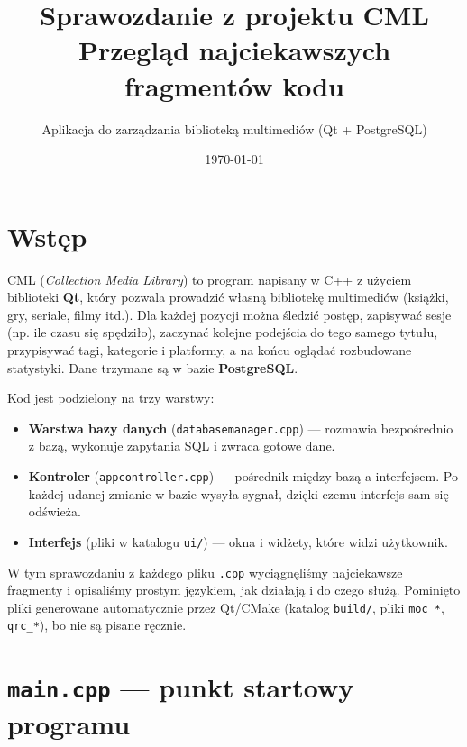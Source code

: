 \documentclass[11pt,a4paper]{article}
\title{\textbf{Sprawozdanie z projektu CML} \\[4pt]
\large Przegląd najciekawszych fragmentów kodu}
\author{Aplikacja do zarządzania biblioteką multimediów (Qt + PostgreSQL)}
\date{\today}
\begin{document}
\maketitle
\tableofcontents
\newpage

\section{Wstęp}

CML (\emph{Collection Media Library}) to program napisany w C++ z użyciem
biblioteki \textbf{Qt}, który pozwala prowadzić własną bibliotekę multimediów
(książki, gry, seriale, filmy itd.). Dla każdej pozycji można śledzić postęp,
zapisywać sesje (np. ile czasu się spędziło), zaczynać kolejne podejścia do
tego samego tytułu, przypisywać tagi, kategorie i platformy, a na końcu oglądać
rozbudowane statystyki. Dane trzymane są w bazie \textbf{PostgreSQL}.

Kod jest podzielony na trzy warstwy:

\begin{itemize}
    \item \textbf{Warstwa bazy danych} (\texttt{databasemanager.cpp}) --- rozmawia
    bezpośrednio z bazą, wykonuje zapytania SQL i zwraca gotowe dane.
    \item \textbf{Kontroler} (\texttt{appcontroller.cpp}) --- pośrednik między
    bazą a interfejsem. Po każdej udanej zmianie w bazie wysyła sygnał, dzięki
    czemu interfejs sam się odświeża.
    \item \textbf{Interfejs} (pliki w katalogu \texttt{ui/}) --- okna i widżety,
    które widzi użytkownik.
\end{itemize}

W tym sprawozdaniu z każdego pliku \texttt{.cpp} wyciągnęliśmy najciekawsze
fragmenty i opisaliśmy prostym językiem, jak działają i do czego służą. Pominięto
pliki generowane automatycznie przez Qt/CMake (katalog \texttt{build/}, pliki
\texttt{moc\_*}, \texttt{qrc\_*}), bo nie są pisane ręcznie.

\section{\texttt{main.cpp} --- punkt startowy programu}
\end{document}
